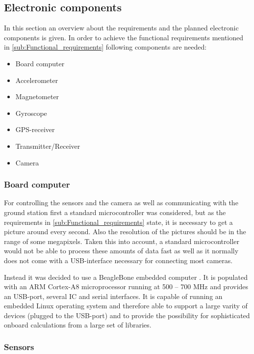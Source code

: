 \documentclass[fontsize=11pt,paper=a4,]{scrartcl}
\begin{document}
\subsection{Electronic components}
In this section an overview about the requirements and the planned electronic components is given. In order to achieve the functional requirements mentioned in \ref{sub:Functional_requirements} following components are needed:

\begin{itemize}
 \item Board computer
 \item Accelerometer
 \item Magnetometer
 \item Gyroscope
 \item GPS-receiver
 \item Transmitter/Receiver
 \item Camera
\end{itemize}


\subsubsection*{Board computer}

For controlling the sensors and the camera as well as communicating with the ground station first a standard microcontroller was considered, but as the requirements in \ref{sub:Functional_requirements} state, it is necessary to get a picture around every second. Also the resolution of the pictures should be in the range of some megapixels. Taken this into account, a standard microcontroller would not be able to process these amounts of data fast as well as it normally does not come with a USB-interface necessary for connecting most cameras.

Instead it was decided to use a BeagleBone embedded computer \cite{BeagleBone:SRM}. It is populated with an ARM Cortex-A8 microprocessor running at 500 -- 700 MHz and provides an USB-port, several I{\texttwosuperior}C and serial interfaces. It is capable of running an embedded Linux operating system and therefore able to support a large varity of devices (plugged to the USB-port) and to provide the possibility for sophisticated onboard calculations from a large set of libraries.

\subsubsection*{Sensors}
\end{document}
